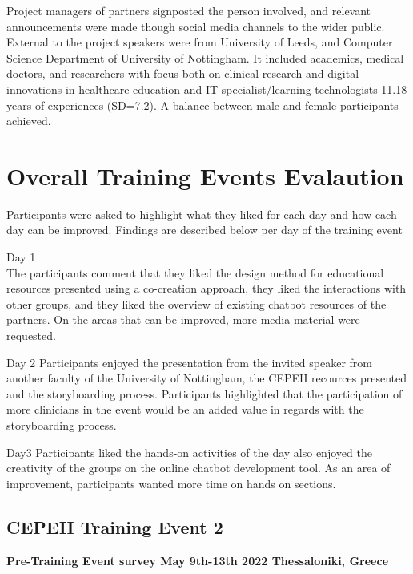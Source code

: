 \documentclass[a4paper, nobind]{templates/ociamthesis}
\begin{document}
Project managers of partners signposted the person involved, and relevant announcements were made though social media channels to the wider public. External to the project speakers were from University of Leeds, and Computer Science Department of University of Nottingham. It included academics, medical doctors, and researchers with focus both on clinical research and digital innovations in healthcare education and IT specialist/learning technologists 11.18 years of experiences (SD=7.2). A balance between male and female participants achieved.

\hypertarget{overall-training-events-evalaution}{%
\chapter{Overall Training Events Evalaution}\label{overall-training-events-evalaution}}

Participants were asked to highlight what they liked for each day and how each day can be improved. Findings are described below per day of the training event

Day 1\\
The participants comment that they liked the design method for educational resources presented using a co-creation approach, they liked the interactions with other groups, and they liked the overview of existing chatbot resources of the partners. On the areas that can be improved, more media material were requested.

Day 2
Participants enjoyed the presentation from the invited speaker from another faculty of the University of Nottingham, the CEPEH recources presented and the storyboarding process. Participants highlighted that the participation of more clinicians in the event would be an added value in regards with the storyboarding process.

Day3
Participants liked the hands-on activities of the day also enjoyed the creativity of the groups on the online chatbot development tool. As an area of improvement, participants wanted more time on hands on sections.

\hypertarget{cepeh-training-event-2}{%
\section{CEPEH Training Event 2}\label{cepeh-training-event-2}}

\textbf{Pre-Training Event survey May 9th-13th 2022 Thessaloniki, Greece}
\end{document}
